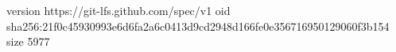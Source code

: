 version https://git-lfs.github.com/spec/v1
oid sha256:21f0c45930993e6d6fa2a6c0413d9cd2948d166fe0e356716950129060f3b154
size 5977
